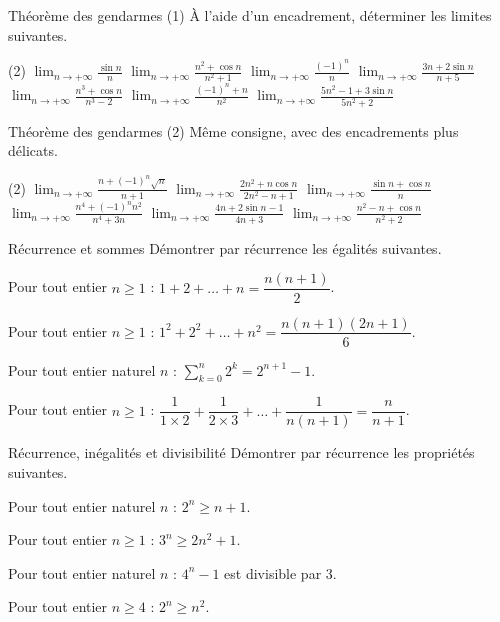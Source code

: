 \begin{exercice}[2]{Théorème des gendarmes (1)}
À l'aide d'un encadrement, déterminer les limites suivantes.
\begin{tasks}(2)
  \task $\displaystyle\lim_{n\to+\infty}\frac{\sin n}{n}$
  \task $\displaystyle\lim_{n\to+\infty}\frac{n^{2}+\cos n}{n^{2}+1}$
  \task $\displaystyle\lim_{n\to+\infty}\frac{(-1)^{n}}{n}$
  \task $\displaystyle\lim_{n\to+\infty}\frac{3n+2\sin n}{n+5}$
  \task $\displaystyle\lim_{n\to+\infty}\frac{n^{3}+\cos n}{n^{3}-2}$
  \task $\displaystyle\lim_{n\to+\infty}\frac{(-1)^{n}+n}{n^{2}}$
  \task $\displaystyle\lim_{n\to+\infty}\frac{5n^{2}-1+3\sin n}{5n^{2}+2}$
\end{tasks}
\end{exercice}

\begin{exercice}[2]{Théorème des gendarmes (2)}
Même consigne, avec des encadrements plus délicats.
\begin{tasks}(2)
  \task $\displaystyle\lim_{n\to+\infty}\frac{n+(-1)^{n}\sqrt{n}}{n+1}$
  \task $\displaystyle\lim_{n\to+\infty}\frac{2n^{2}+n\cos n}{2n^{2}-n+1}$
  \task $\displaystyle\lim_{n\to+\infty}\frac{\sin n+\cos n}{n}$
  \task $\displaystyle\lim_{n\to+\infty}\frac{n^{4}+(-1)^{n}n^{2}}{n^{4}+3n}$
  \task $\displaystyle\lim_{n\to+\infty}\frac{4n+2\sin n-1}{4n+3}$
  \task $\displaystyle\lim_{n\to+\infty}\frac{n^{2}-n+\cos n}{n^{2}+2}$
\end{tasks}
\end{exercice}

\begin{exercice}[2]{Récurrence et sommes}
Démontrer par récurrence les égalités suivantes.
\begin{questions}
  \item Pour tout entier $n\geq1$ : $1+2+\dots+n=\dfrac{n(n+1)}{2}$.
  \item Pour tout entier $n\geq1$ : $1^{2}+2^{2}+\dots+n^{2}=\dfrac{n(n+1)(2n+1)}{6}$.
  \item Pour tout entier naturel $n$ : $\displaystyle\sum_{k=0}^{n}2^{k}=2^{n+1}-1$.
  \item Pour tout entier $n\geq1$ : $\dfrac{1}{1\times2}+\dfrac{1}{2\times3}+\dots+\dfrac{1}{n(n+1)}=\dfrac{n}{n+1}$.
\end{questions}
\end{exercice}

\begin{exercice}[2]{Récurrence, inégalités et divisibilité}
Démontrer par récurrence les propriétés suivantes.
\begin{questions}
  \item Pour tout entier naturel $n$ : $2^{n}\geq n+1$.
  \item Pour tout entier $n\geq1$ : $3^{n}\geq2n^{2}+1$.
  \item Pour tout entier naturel $n$ : $4^{n}-1$ est divisible par $3$.
  \item Pour tout entier $n\geq4$ : $2^{n}\geq n^{2}$.
\end{questions}
\end{exercice}


